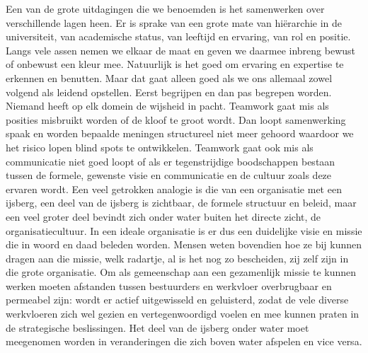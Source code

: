 \documentclass{jote-book}
\begin{document}
	Een van de grote uitdagingen die we benoemden is het samenwerken over verschillende lagen heen. Er is sprake van een grote mate van hiërarchie in de universiteit, van academische status, van leeftijd en ervaring, van rol en positie. Langs vele assen nemen we elkaar de maat en geven we daarmee inbreng bewust of onbewust een kleur mee. Natuurlijk is het goed om ervaring en expertise te erkennen en benutten. Maar dat gaat alleen goed als we ons allemaal zowel volgend als leidend opstellen. Eerst begrijpen en dan pas begrepen worden. Niemand heeft op elk domein de wijsheid in pacht. Teamwork gaat mis als posities misbruikt worden of de kloof te groot wordt. Dan loopt samenwerking spaak en worden bepaalde meningen structureel niet meer gehoord waardoor we het risico lopen blind spots te ontwikkelen. Teamwork gaat ook mis als communicatie niet goed loopt of als er tegenstrijdige boodschappen bestaan tussen de formele, gewenste visie en communicatie en de cultuur zoals deze ervaren wordt. Een veel getrokken analogie is die van een organisatie met een ijsberg, een deel van de ijsberg is zichtbaar, de formele structuur en beleid, maar een veel groter deel bevindt zich onder water buiten het directe zicht, de organisatiecultuur. In een ideale organisatie is er dus een duidelijke visie en missie die in woord en daad beleden worden. Mensen weten bovendien hoe ze bij kunnen dragen aan die missie, welk radartje, al is het nog zo bescheiden, zij zelf zijn in die grote organisatie. Om als gemeenschap aan een gezamenlijk missie te kunnen werken moeten afstanden tussen bestuurders en werkvloer overbrugbaar en permeabel zijn: wordt er actief uitgewisseld en geluisterd, zodat de vele diverse werkvloeren zich wel gezien en vertegenwoordigd voelen en mee kunnen praten in de strategische beslissingen. Het deel van de ijsberg onder water moet meegenomen worden in veranderingen die zich boven water afspelen en vice versa.
\end{document}
